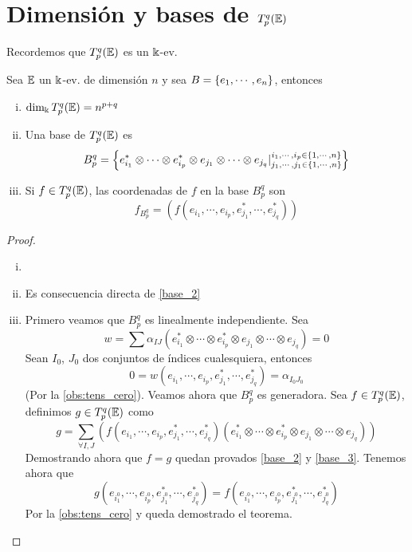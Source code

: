 \section{Dimensión y bases de $T_p^q(\E)$}

Recordemos que $T_p^q(\E)$ es un $\Bbbk$-ev.

\begin{teo}[de la base de $T_p^q(\E)$]
    Sea $\mathbb{E}$ un $\Bbbk$-ev. de dimensión $n$ y sea $B = \left\{e_1, \cdots, e_n\right\}$,
    entonces
\begin{enumerate}[i)]
        \item $\dim_\Bbbk T_p^q(\mathbb{E}) = n^{p+q}$
        \item \label{base_2} Una base de $T_p^q(\E)$ es
        \[
            B_p^q = \left\{ e_{i_1}^* \otimes \cdots \otimes e_{i_p}^* \otimes
            e_{j_1} \otimes \cdots \otimes e_{j_q} \vert
            \substack{i_1, \cdots, i_p \in \left\{1,\cdots,n\right\} \\
                j_1, \cdots, j_1 \in \left\{1,\cdots,n\right\}} \right\}
        \]
        \item \label{base_3} Si $f \in T_p^q(\mathbb{E})$, las coordenadas de $f$ en la base $B_p^q$ son
        \[
            f_{B_p^q} = (f(e_{i_1}, \cdots, e_{i_p}, e_{j_1}^*, \cdots, e_{j_q}^*))
        \]
    \end{enumerate}
\end{teo}
\begin{proof}
    \begin{enumerate}[i)]
        \item[]
        \item Es consecuencia directa de \ref{base_2}
        \item Primero veamos que $B_p^q$ es linealmente independiente. Sea
        \[
            w = \sum \alpha_{IJ}(e_{i_1}^* \otimes \cdots \otimes e_{i_p}^*
            \otimes e_{j_1} \otimes \cdots \otimes e_{j_q}) = 0
        \]
        Sean $I_0$, $J_0$ dos conjuntos de índices cualesquiera, entonces
        \[
            0 = w(e_{i_1}, \cdots, e_{i_p}, e_{j_1}^*, \cdots, e_{j_q}^*)
            = \alpha_{I_0J_0}
        \]
        (Por la \ref{obs:tens_cero}). Veamos ahora que $B_p^q$
        es generadora. Sea $f \in T_p^q(\mathbb{E})$, definimos $g \in T_p^q(\mathbb{E})$ como
        \[
            g = \sum_{\forall I,J} (f(e_{i_1}, \cdots, e_{i_p}, e_{j_1}^*, \cdots,
            e_{j_q}^*)(e_{i_1}^* \otimes \cdots \otimes e_{i_p}^* \otimes e_{j_1}
            \otimes \cdots \otimes e_{j_q}))
        \]
        Demostrando ahora que $f=g$ quedan provados \ref{base_2} y \ref{base_3}.
        Tenemos ahora que
        \[
            g(e_{i_1^0}, \cdots, e_{i_p^0}, e_{j_1^0}^*, \cdots, e_{j_q^0}^*) =
            f(e_{i_1^0}, \cdots, e_{i_p^0}, e_{j_1^0}^*, \cdots, e_{j_q^0}^*)
        \]
        Por la \ref{obs:tens_cero} y queda demostrado el teorema.
    \end{enumerate}
\end{proof}
